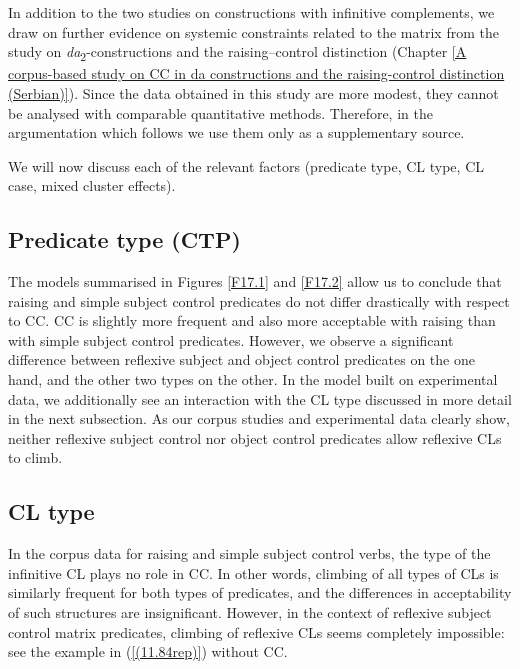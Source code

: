 In addition to the two studies on constructions with infinitive complements, we draw on further evidence on systemic constraints related to the matrix from the study on \textit{da}\textsubscript{2}-constructions and the raising--control distinction (Chapter \ref{A corpus-based study on CC in da constructions and the raising-control distinction (Serbian)}). Since the data obtained in this study are more modest, they cannot be analysed with comparable quantitative methods. Therefore, in the argumentation which follows we use them only as a supplementary source.

We will now discuss each of the relevant factors (predicate type, CL type, CL case, mixed cluster effects).

\subsection{Predicate type (CTP)}
\label{Predicate type (CTP)}

The models summarised in Figures \ref{F17.1} and \ref{F17.2} allow us to conclude that raising and simple subject control predicates do not differ drastically with respect to CC. CC is slightly more frequent and also more acceptable with raising than with simple subject control predicates. However, we observe a significant difference between reflexive subject and object control predicates on the one hand, and the other two types on the other. In the model built on experimental data, we additionally see an interaction with the CL type discussed in more detail in the next subsection. As our corpus studies and experimental data clearly show, neither reflexive subject control nor object control predicates allow reflexive CLs to climb.

\subsection{CL type}
\label{CL type}
In the corpus data for raising and simple subject control verbs, the type of the infinitive CL plays no role in CC. In other words, climbing of all types of CLs is similarly frequent for both types of predicates, and the differences in acceptability of such structures are insignificant. However, in the context of reflexive subject control matrix predicates, climbing of reflexive CLs seems completely impossible: see the example in (\ref{(11.84rep)}) without CC.

